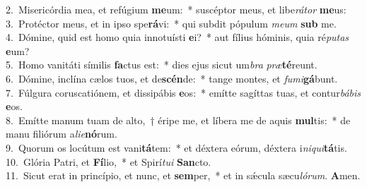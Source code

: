 {2.~}Misericórdia mea, et refúgium \textbf{me}um:~* suscéptor meus, et libe\textit{rá}\textit{tor} \textbf{me}us:\\
{3.~}Protéctor meus, et in ipso spe\textbf{rá}vi:~* qui subdit pópulum \textit{me}\textit{um} \textbf{sub} me.\\
{4.~}Dómine, quid est homo quia innotuísti \textbf{e}i?~* aut fílius hóminis, quia ré\textit{pu}\textit{tas} \textbf{e}um?\\
{5.~}Homo vanitáti símilis \textbf{fa}ctus est:~* dies ejus sicut um\textit{bra} \textit{præ}\textbf{té}reunt.\\
{6.~}Dómine, inclína cælos tuos, et de\textbf{scén}de:~* tange montes, et \textit{fu}\textit{mi}\textbf{gá}bunt.\\
{7.~}Fúlgura coruscatiónem, et dissipábis \textbf{e}os:~* emítte sagíttas tuas, et contur\textit{bá}\textit{bis} \textbf{e}os.\\
{8.~}Emítte manum tuam de alto,~† éripe me, et líbera me de aquis \textbf{mul}tis:~* de manu filiórum a\textit{li}\textit{e}\textbf{nó}rum.\\
{9.~}Quorum os locútum est vani\textbf{tá}tem:~* et déxtera eórum, déxtera i\textit{ni}\textit{qui}\textbf{tá}tis.\\
{10.~}Glória Patri, et \textbf{Fí}lio,~* et Spirí\textit{tu}\textit{i} \textbf{San}cto.\\
{11.~}Sicut erat in princípio, et nunc, et \textbf{sem}per,~* et in sǽcula sæcu\textit{ló}\textit{rum}. \textbf{A}men.\\
